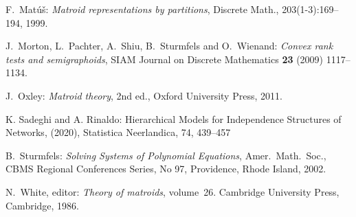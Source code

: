 \documentclass[12pt]{extarticle}
\theoremstyle{definition}
\numberwithin{theorem}{section}
\begin{document}
\begin{thebibliography}{10}
F.~Mat\'u\v{s}: {\em Matroid representations by partitions},
Discrete Math., 203(1-3):169--194, 1999.

J.~Morton, L.~Pachter, A.~Shiu, B.~Sturmfels and O.~Wienand:
{\em Convex rank tests and semigraphoids},
SIAM Journal on Discrete Mathematics {\bf 23} (2009) 1117--1134.

J.~Oxley: {\em Matroid theory},
2nd ed., Oxford University Press, 2011.

K. Sadeghi and A. Rinaldo: Hierarchical Models for Independence Structures of Networks,  (2020), Statistica Neerlandica, 74, 439--457

B.~Sturmfels: {\em Solving Systems of Polynomial Equations},
Amer.~Math.~Soc., CBMS Regional Conferences Series, No 97, Providence, Rhode Island, 2002.

N.~White, editor: {\em Theory of matroids}, volume~26.
Cambridge University Press, Cambridge, 1986.

\end{thebibliography}
\end{document}
